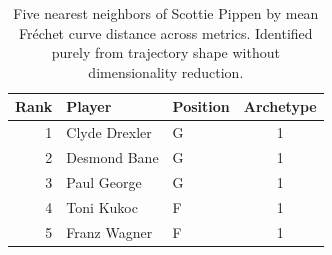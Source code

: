 \begin{table}[htbp]
  \centering\small
  \begin{tabular}{rllc}
    \toprule
    Rank & Player & Position & Archetype \\
    \midrule
    1 & Clyde Drexler & G & 1 \\
    2 & Desmond Bane & G & 1 \\
    3 & Paul George & G & 1 \\
    4 & Toni Kukoc & F & 1 \\
    5 & Franz Wagner & F & 1 \\
    \bottomrule
  \end{tabular}
  \caption{Five nearest neighbors of Scottie Pippen by mean Fr\'{e}chet curve distance across metrics. Identified purely from trajectory shape without dimensionality reduction.}
  \label{tab:Scottie_Pippen_frechet_curve_neighbors}
\end{table}

